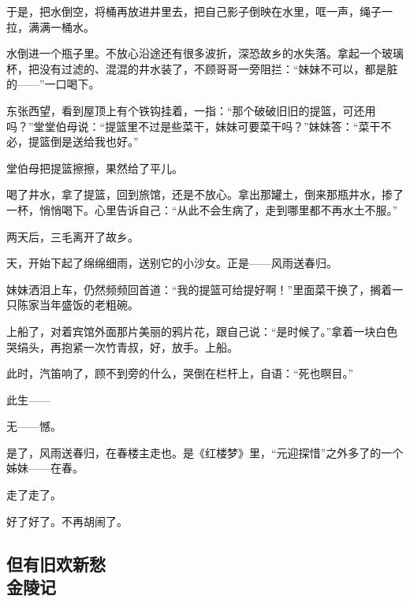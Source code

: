 \par 于是，把水倒空，将桶再放进井里去，把自己影子倒映在水里，哐一声，绳子一拉，满满一桶水。
\par 水倒进一个瓶子里。不放心沿途还有很多波折，深恐故乡的水失落。拿起一个玻璃杯，把没有过滤的、混混的井水装了，不顾哥哥一旁阻拦：“妹妹不可以，都是脏的——”一口喝下。
\par 东张西望，看到屋顶上有个铁钩挂着，一指：“那个破破旧旧的提篮，可还用吗？”堂堂伯母说：“提篮里不过是些菜干，妹妹可要菜干吗？”妹妹答：“菜干不必，提篮倒是送给我也好。”
\par 堂伯母把提篮擦擦，果然给了平儿。
\par 喝了井水，拿了提篮，回到旅馆，还是不放心。拿出那罐土，倒来那瓶井水，掺了一杯，悄悄喝下。心里告诉自己：“从此不会生病了，走到哪里都不再水土不服。”
\par 两天后，三毛离开了故乡。
\par 天，开始下起了绵绵细雨，送别它的小沙女。正是——风雨送春归。
\par 妹妹洒泪上车，仍然频频回首道：“我的提篮可给提好啊！”里面菜干换了，搁着一只陈家当年盛饭的老粗碗。
\par 上船了，对着宾馆外面那片美丽的鸦片花，跟自己说：“是时候了。”拿着一块白色哭绢头，再抱紧一次竹青叔，好，放手。上船。
\par 此时，汽笛响了，顾不到旁的什么，哭倒在栏杆上，自语：“死也瞑目。”
\par 此生——
\par 无——憾。
\par 是了，风雨送春归，在春楼主走也。是《红楼梦》里，“元迎探惜”之外多了的一个姊妹——在春。
\par 走了走了。
\par 好了好了。不再胡闹了。


\subsection{但有旧欢新愁\\\small{金陵记}}

